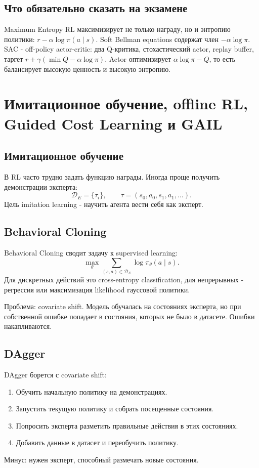 \documentclass[11pt,a4paper]{article}
\newcommand{\1}{\mathbf{1}}
\newcommand{\cD}{\mathcal D}
\begin{document}
\subsection*{Что обязательно сказать на экзамене}
Maximum Entropy RL максимизирует не только награду, но и энтропию политики: $r-\alpha\log\pi(a\mid s)$. Soft Bellman equations содержат член $-\alpha\log\pi$. SAC - off-policy actor-critic: два Q-критика, стохастический actor, replay buffer, таргет $r+\gamma(\min Q-\alpha\log\pi)$. Actor оптимизирует $\alpha\log\pi-Q$, то есть балансирует высокую ценность и высокую энтропию.

\newpage
\section{Имитационное обучение, offline RL, Guided Cost Learning и GAIL}

\subsection*{Имитационное обучение}
В RL часто трудно задать функцию награды. Иногда проще получить демонстрации эксперта:
\[
    \cD_E=\{\tau_i\},\qquad \tau=(s_0,a_0,s_1,a_1,\dots).
\]
Цель imitation learning - научить агента вести себя как эксперт.

\subsection*{Behavioral Cloning}
Behavioral Cloning сводит задачу к supervised learning:
\[
    \max_\theta \sum_{(s,a)\in\cD_E}\log\pi_\theta(a\mid s).
\]
Для дискретных действий это cross-entropy classification, для непрерывных - регрессия или максимизация likelihood гауссовой политики.

Проблема: covariate shift. Модель обучалась на состояниях эксперта, но при собственной ошибке попадает в состояния, которых не было в датасете. Ошибки накапливаются.

\subsection*{DAgger}
DAgger борется с covariate shift:
\begin{enumerate}
    \item Обучить начальную политику на демонстрациях.
    \item Запустить текущую политику и собрать посещенные состояния.
    \item Попросить эксперта разметить правильные действия в этих состояниях.
    \item Добавить данные в датасет и переобучить политику.
\end{enumerate}
Минус: нужен эксперт, способный размечать новые состояния.
\end{document}
